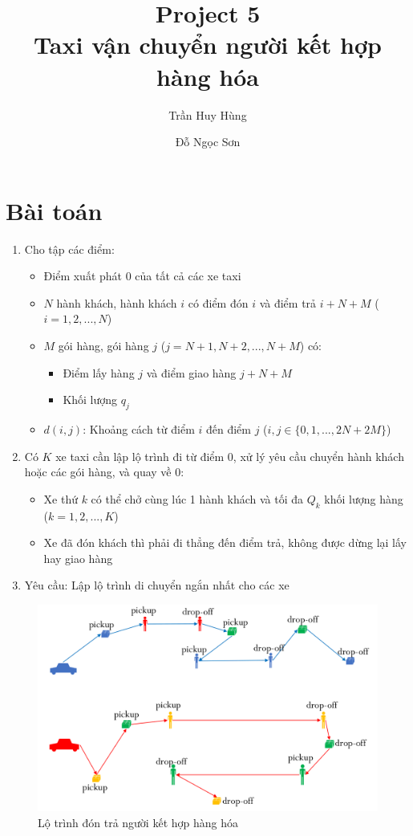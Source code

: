 \documentclass[3p,12pt]{article}
\title{Project 5 \\
	Taxi vận chuyển người kết hợp hàng hóa}
\author{Trần Huy Hùng \and Đỗ Ngọc Sơn}
\begin{document}
	\maketitle
		
	\section{Bài toán}
	\begin{enumerate}
		\item Cho tập các điểm:
		\begin{itemize}
			\item Điểm xuất phát $0$ của tất cả các xe taxi
			\item $N$ hành khách, hành khách $i$ có điểm đón $i$ và điểm trả $i+N+M$ ($i=1,2,...,N$)
			\item $M$ gói hàng, gói hàng $j$ ($j=N+1,N+2,...,N+M$) có:
			\begin{itemize}
				\item Điểm lấy hàng $j$ và điểm giao hàng $j+N+M$ 
				\item Khối lượng $q_j$
			\end{itemize}
			\item $d(i,j)$: Khoảng cách từ điểm $i$ đến điểm $j$ ($i,j\in \{0,1,...,2N+2M\}$)
		\end{itemize}
		\item Có $K$ xe taxi cần lập lộ trình đi từ điểm $0$, xử lý yêu cầu chuyển hành khách hoặc các gói hàng, và quay về $0$:
		\begin{itemize}
			\item Xe thứ $k$ có thể chở cùng lúc 1 hành khách và tối đa $Q_k$ khối lượng hàng ($k=1,2,...,K$)
			\item Xe đã đón khách thì phải đi thẳng đến điểm trả, không được dừng lại lấy hay giao hàng
		\end{itemize}
		\item Yêu cầu: Lập lộ trình di chuyển ngắn nhất cho các xe
	\end{enumerate}
	\begin{figure}
		\centering
		\caption{Lộ trình đón trả người kết hợp hàng hóa}
		\includegraphics[width=\textwidth]{taxi.png}
	\end{figure}
\end{document}
